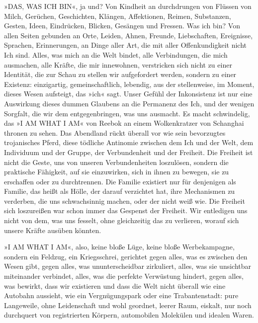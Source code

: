»DAS, WAS ICH BIN«, ja und? Von Kindheit an durchdrungen von
Flüssen von Milch, Gerüchen, Geschichten, Klängen, Affektionen,
Reimen, Substanzen, Gesten, Ideen, Eindrücken, Blicken, Gesängen
und Fressen. Was ich bin? Von allen Seiten gebunden an Orte,
Leiden, Ahnen, Freunde, Liebschaften, Ereignisse, Sprachen,
Erinnerungen, an Dinge aller Art, die mit aller Offenkundigkeit
nicht Ich sind. Alles, was mich an die Welt bindet, alle
Verbindungen, die mich ausmachen, alle Kräfte, die mir innewohnen,
verstricken sich nicht zu einer Identität, die zur Schau zu stellen
wir aufgefordert werden, sondern zu einer Existenz: einzigartig,
gemeinschaftlich, lebendig, aus der stellenweise, im Moment, dieses
Wesen aufsteigt, das »ich« sagt. Unser Gefühl der Inkonsistenz ist
nur eine Auswirkung dieses dummen Glaubens an die Permanenz des
Ich, und der wenigen Sorgfalt, die wir dem entgegenbringen, was uns
ausmacht.
Es macht schwindelig, das »I AM WHAT I AM« von Reebok an einem
Wolkenkratzer von Schanghai thronen zu sehen. Das Abendland rückt
überall vor wie sein bevorzugtes trojanisches Pferd, diese tödliche
Antinomie zwischen dem Ich und der Welt, dem Individuum und der
Gruppe, der Verbundenheit und der Freiheit. Die Freiheit ist nicht
die Geste, uns von unseren Verbundenheiten loszulösen, sondern die
praktische Fähigkeit, auf sie einzuwirken, sich in ihnen zu
bewegen, sie zu erschaffen oder zu durchtrennen. Die Familie
existiert nur für denjenigen als Familie, das heißt als Hölle, der
darauf verzichtet hat, ihre Mechanismen zu verderben, die uns
schwachsinnig machen, oder der nicht weiß wie. Die Freiheit sich
loszureißen war schon immer das Gespenst der Freiheit. Wir
entledigen uns nicht von dem, was uns fesselt, ohne gleichzeitig
das zu verlieren, worauf sich unsere Kräfte ausüben könnten.

»I AM WHAT I AM«, also, keine bloße Lüge, keine bloße
Werbekampagne, sondern ein Feldzug, ein Kriegsschrei, gerichtet
gegen alles, was es zwischen den Wesen gibt, gegen alles, was
ununterscheidbar zirkuliert, alles, was sie unsichtbar miteinander
verbindet, alles, was die perfekte Verwüstung hindert, gegen alles,
was bewirkt, dass wir existieren und dass die Welt nicht überall
wie eine Autobahn aussieht, wie ein Vergnügungspark oder eine
Trabantenstadt: pure Langeweile, ohne Leidenschaft und wohl
geordnet, leerer Raum, eiskalt, nur noch durchquert von
registrierten Körpern, automobilen Molekülen und idealen Waren.

